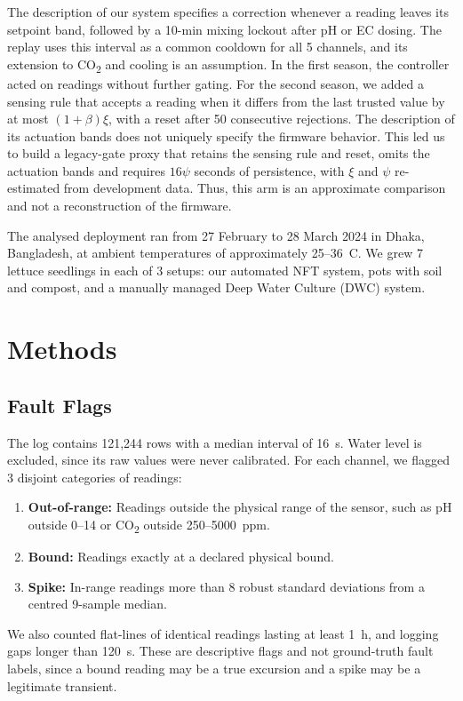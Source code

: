 \documentclass[preprint,12pt,doubleblind]{elsarticle}
\newcommand{\COtwo}{CO\textsubscript{2}}
\begin{document}
The description of our system specifies a correction whenever a reading leaves its setpoint band, followed by a 10-min mixing lockout after pH or EC dosing. The replay uses this interval as a common cooldown for all 5 channels, and its extension to \COtwo{} and cooling is an assumption. In the first season, the controller acted on readings without further gating. For the second season, we added a sensing rule that accepts a reading when it differs from the last trusted value by at most $(1+\beta)\xi$, with a reset after 50 consecutive rejections. The description of its actuation bands does not uniquely specify the firmware behavior. This led us to build a legacy-gate proxy that retains the sensing rule and reset, omits the actuation bands and requires $16\psi$ seconds of persistence, with $\xi$ and $\psi$ re-estimated from development data. Thus, this arm is an approximate comparison and not a reconstruction of the firmware.

The analysed deployment ran from 27 February to 28 March 2024 in Dhaka, Bangladesh, at ambient temperatures of approximately 25--36~\textdegree C. We grew 7 lettuce seedlings in each of 3 setups: our automated NFT system, pots with soil and compost, and a manually managed Deep Water Culture (DWC) system.

\section{Methods}
\label{sec:methods}
\subsection{Fault Flags}
The log contains 121,244 rows with a median interval of 16~s. Water level is excluded, since its raw values were never calibrated. For each channel, we flagged 3 disjoint categories of readings:
\begin{enumerate}
\item \textbf{Out-of-range:} Readings outside the physical range of the sensor, such as pH outside 0--14 or \COtwo{} outside 250--5000~ppm.
\item \textbf{Bound:} Readings exactly at a declared physical bound.
\item \textbf{Spike:} In-range readings more than 8 robust standard deviations from a centred 9-sample median.
\end{enumerate}
We also counted flat-lines of identical readings lasting at least 1~h, and logging gaps longer than 120~s. These are descriptive flags and not ground-truth fault labels, since a bound reading may be a true excursion and a spike may be a legitimate transient.
\end{document}
